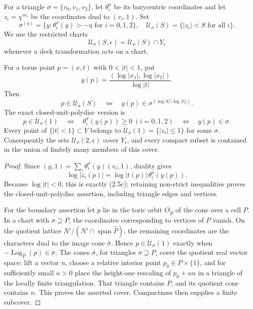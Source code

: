 For a triangle \(\sigma=\{v_0,v_1,v_2\}\), let
\(\theta_i^\sigma\) be its barycentric coordinates and let
\(z_i=\chi^{m_i}\) be the coordinates dual to
\((v_i,1)\).  Set
\[
 \sigma^{(\eta)}=\{y:\theta_i^\sigma(y)>-\eta\text{ for }i=0,1,2\},
 \quad
 \mathcal U_\sigma(S)=\{|z_i|<S\text{ for all }i\}.
\]
We use the restricted charts
\[
 \mathcal U_\sigma(S,\epsilon)=\mathcal U_\sigma(S)\cap Y_\epsilon
\]
whenever a deck transformation acts on a chart.

\begin{lemma}
\label{wb:lem:toric-chart-control}
For a torus point \(p=(x,t)\) with \(0<|t|<1\), put
\[
 y(p)=\frac{(\log|x_1|,\log|x_2|)}{\log|t|}.
\]
Then
\[
 p\in\mathcal U_\sigma(S)
 \quad\Longleftrightarrow\quad
 y(p)\in\sigma^{(\log S/|\log|t||)}.
 \tag{2.5c}
\]
The exact closed-unit-polydisc version is
\begin{equation}
 p\in\overline{\mathcal U}_\sigma(1)
 \quad\Longleftrightarrow\quad
 \theta_i^\sigma(y(p))\ge0\ (i=0,1,2)
 \quad\Longleftrightarrow\quad y(p)\in\sigma.
\label{wb:eq:cusp-closed-chart-identity}
\end{equation}
Every point of \(\{|t|<1\}\subset Y\) belongs to
\(\overline{\mathcal U}_\sigma(1)=\{|z_i|\le1\}\) for some \(\sigma\).
Consequently the sets \(\mathcal U_\sigma(2,\epsilon)\) cover \(Y_\epsilon\), and
every compact subset is contained in the union of finitely many members of
this cover.
\end{lemma}

\begin{proof}
Since \((y,1)=\sum_i\theta_i^\sigma(y)(v_i,1)\), duality gives
\[
 \log|z_i(p)|=\log|t(p)|\,\theta_i^\sigma(y(p)).
\]
Because \(\log|t|<0\), this is exactly (2.5c); retaining non-strict
inequalities proves the closed-unit-polydisc assertion, including triangle
edges and vertices.

For the boundary assertion let \(p\) lie in the toric orbit
\(O_{\widehat P}\) of the cone over a cell \(P\).  In a chart with
\(\sigma\supseteq P\), the coordinates corresponding to vertices of
\(P\) vanish.  On the quotient lattice
\(N'/(N'\cap\operatorname{span}\widehat P)\), the remaining coordinates
are the characters dual to the image cone \(\bar\sigma\).  Hence
\(p\in\overline{\mathcal U}_\sigma(1)\) exactly when
\(-\operatorname{Log}_{\widehat P}(p)\in\bar\sigma\).
The cones \(\bar\sigma\), for triangles \(\sigma\supseteq P\), cover the
quotient real vector space: lift a vector \(n\), choose a relative interior
point \(p_0\in P\times\{1\}\), and for sufficiently small \(u>0\) place
the height-one rescaling of \(p_0+un\) in a triangle of the locally finite
triangulation.  That triangle contains \(P\), and its quotient cone contains
\(n\).  This proves the asserted cover.  Compactness then supplies a finite
subcover.
\end{proof}

